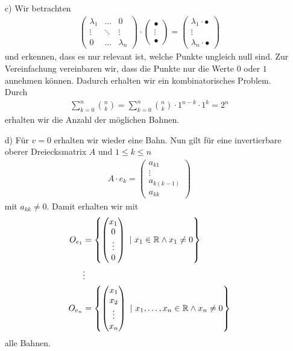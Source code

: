 \begin{loes}
\begin{enumerate}
		\item[c)]
		Wir betrachten 
		\begin{align*}
		\begin{pmatrix}
		\lambda_1 & \hdots & 0\\
		\vdots  &\ddots & \vdots \\
		0  & \hdots & \lambda_n
		\end{pmatrix}
		\cdot
		\begin{pmatrix}
		\bullet \\
		\vdots \\
		\bullet
		\end{pmatrix}
		= 
		\begin{pmatrix}
		\lambda_1\cdot \bullet \\
		\vdots \\
		 \lambda_n \cdot\bullet
		\end{pmatrix}
		\end{align*}
		und erkennen, dass es nur relevant ist, welche Punkte ungleich null sind.
		Zur Vereinfachung vereinbaren wir, dass die Punkte nur die Werte $ 0 $ oder $ 1 $
		annehmen können.
		Dadurch erhalten wir ein kombinatorisches Problem.
		Durch 
		\begin{align*}
		\sum \limits_{k=0}^n \binom{n}{k}
		=
		\sum \limits_{k=0}^n \binom{n}{k} \cdot 1^{n-k} \cdot 1^k
		=2^n
		\end{align*}
		erhalten wir die Anzahl der möglichen Bahnen.
		
		\item[d)]
		Für $ v = 0  $ erhalten wir wieder eine Bahn.
		Nun gilt für eine invertierbare oberer Dreiecksmatrix $ A $ und 
		$ 1 \leq k \leq n $
		\begin{align*}
		A \cdot e_k = 
		\begin{pmatrix}
		a_{k1}\\
		\vdots\\
		a_{k(k-1)}\\
		a_{kk}
		\end{pmatrix}
		\end{align*}
		mit $ a_{kk} \neq 0 $.
		Damit erhalten wir mit
		\begin{align*}
		O_{e_1} &= \left\lbrace 
		\begin{pmatrix}
		x_1 \\
		0\\
		\vdots\\
		0	
		\end{pmatrix}
		\ | \ x_1 \in \mathbb{R} \wedge x_1 \neq 0 \right\rbrace \\
		&\vdots\\
		O_{e_n} &= \left\lbrace 
		\begin{pmatrix}
		x_1 \\
		x_2\\
		\vdots\\
		x_n	
		\end{pmatrix}
		\ | \ x_1,\dots ,x_n \in \mathbb{R} \wedge x_n \neq 0 \right\rbrace 
		\end{align*}
		alle Bahnen.
	\end{enumerate}
\end{loes}

